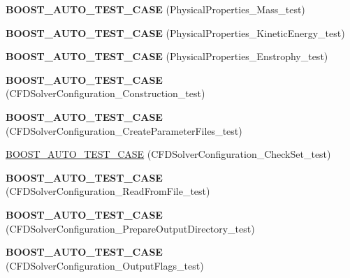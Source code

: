 \begin{DoxyCompactItemize}
\item 
\hypertarget{namespacenatrium_a2f6d36631d1209cc3bcf60be653b9d1c}{
{\bfseries BOOST\_\-AUTO\_\-TEST\_\-CASE} (PhysicalProperties\_\-Mass\_\-test)}
\label{namespacenatrium_a2f6d36631d1209cc3bcf60be653b9d1c}

\item 
\hypertarget{namespacenatrium_aa10f55a443c7883764bb737a0dc2703c}{
{\bfseries BOOST\_\-AUTO\_\-TEST\_\-CASE} (PhysicalProperties\_\-KineticEnergy\_\-test)}
\label{namespacenatrium_aa10f55a443c7883764bb737a0dc2703c}

\item 
\hypertarget{namespacenatrium_a09203b04dcf3f8d697ea3a274f122ee7}{
{\bfseries BOOST\_\-AUTO\_\-TEST\_\-CASE} (PhysicalProperties\_\-Enstrophy\_\-test)}
\label{namespacenatrium_a09203b04dcf3f8d697ea3a274f122ee7}

\item 
\hypertarget{namespacenatrium_ab5cc1869722e5d7a01921c8c4d7508c4}{
{\bfseries BOOST\_\-AUTO\_\-TEST\_\-CASE} (CFDSolverConfiguration\_\-Construction\_\-test)}
\label{namespacenatrium_ab5cc1869722e5d7a01921c8c4d7508c4}

\item 
\hypertarget{namespacenatrium_ab6670763e204b340b8d08a8ea40ab784}{
{\bfseries BOOST\_\-AUTO\_\-TEST\_\-CASE} (CFDSolverConfiguration\_\-CreateParameterFiles\_\-test)}
\label{namespacenatrium_ab6670763e204b340b8d08a8ea40ab784}

\item 
\hyperlink{namespacenatrium_ac5584f4e62acc077516547aba5d60fe0}{BOOST\_\-AUTO\_\-TEST\_\-CASE} (CFDSolverConfiguration\_\-CheckSet\_\-test)
\item 
\hypertarget{namespacenatrium_ac4ceabb9b7aa1a42d5b60a4f65fc9808}{
{\bfseries BOOST\_\-AUTO\_\-TEST\_\-CASE} (CFDSolverConfiguration\_\-ReadFromFile\_\-test)}
\label{namespacenatrium_ac4ceabb9b7aa1a42d5b60a4f65fc9808}

\item 
\hypertarget{namespacenatrium_ac47b8864fc751be468f8fed651695b79}{
{\bfseries BOOST\_\-AUTO\_\-TEST\_\-CASE} (CFDSolverConfiguration\_\-PrepareOutputDirectory\_\-test)}
\label{namespacenatrium_ac47b8864fc751be468f8fed651695b79}

\item 
\hypertarget{namespacenatrium_a7674a6713c567058866476c0e2f923ac}{
{\bfseries BOOST\_\-AUTO\_\-TEST\_\-CASE} (CFDSolverConfiguration\_\-OutputFlags\_\-test)}
\label{namespacenatrium_a7674a6713c567058866476c0e2f923ac}


\end{DoxyCompactItemize}
